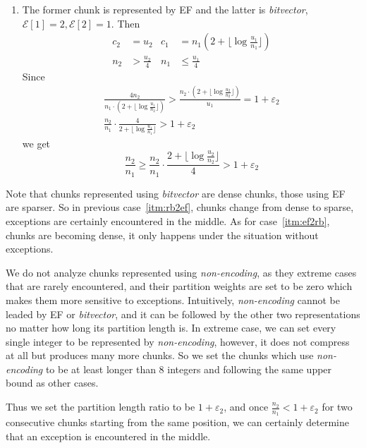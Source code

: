 \documentclass[runningheads]{comsis2}
\begin{document}
\begin{enumerate}
	\item \label{itm:ef2rb}
	The former chunk is represented by EF and the latter is \textit{bitvector}, $ \mathcal{E}[1]= 2, \mathcal{E}[2]=1 $.
	Then
	\begin{align*}
	c_2 & = u_2 & c_1 & = n_1(2+\lfloor \log \frac{u_1}{n_1} \rfloor)\\ 
	n_2 & > \frac{u_2}{4} & n_1 & \leq \frac{u_1}{4}
	\end{align*}
	Since
	\begin{gather*}
	\frac{4 n_2}{n_1 \cdot (2+\lfloor \log \frac{u_1}{n_2} \rfloor)} > \frac{n_2 \cdot (2+\lfloor \log \frac{u_2}{n_2} \rfloor)}{u_1} = 1 + \varepsilon_2 \\
	\frac{n_2}{n_1} \cdot \frac{4}{2+\lfloor \log \frac{u_1}{n_1} \rfloor} > 1 + \varepsilon_2
	\end{gather*}
	we get
	\[
	\frac{n_2}{n_1} \geq \frac{n_2}{n_1} \cdot \frac{2+\lfloor \log \frac{u_2}{n_2} \rfloor}{4} > 1 + \varepsilon_2
	\]
\end{enumerate}

Note that chunks represented using \textit{bitvector} are dense chunks, those using EF are sparser.
So in previous case~\ref{itm:rb2ef}, chunks change from dense to sparse, exceptions are certainly encountered in the middle.
As for case~\ref{itm:ef2rb}, chunks are becoming dense, it only happens under the situation without exceptions.

We do not analyze chunks represented using \textit{non-encoding}, as they extreme cases that are rarely encountered, and their partition weights are set to be zero which makes them more sensitive to exceptions.
Intuitively, \textit{non-encoding} cannot be leaded by EF or \textit{bitvector}, and it can be followed by the other two representations no matter how long its partition length is.
In extreme case, we can set every single integer to be represented by \textit{non-encoding}, however, it does not compress at all but produces many more chunks.
So we set the chunks which use \textit{non-encoding} to be at least longer than 8 integers and following the same upper bound as other cases.

Thus we set the partition length ratio to be $ 1+\varepsilon_2 $, and once $ \frac{n_2}{n_1} < 1+ \varepsilon_2 $ for two consecutive chunks starting from the same position, we can certainly determine that an exception is encountered in the middle.


%
%

\end{document}
